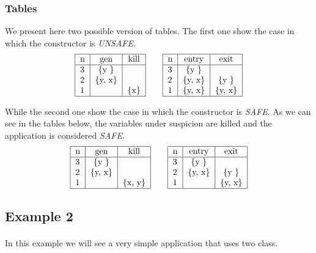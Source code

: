 \documentclass[letterpaper,twocolumn,10pt]{article}
\begin{document}
\subsubsection{Tables}
We present here two possible version of tables. The first one show the case in which the constructor is \emph{UNSAFE}.
\begin{align*}
\begin{tabular}{|l|*{2}{c|}}
  \hline
  n & gen & kill  \\
  \hline 
  3 & \{y \} & \\ 
  2 & \{y, x\} & \\
  1 &  & \{x\} \\
  \hline
\end{tabular}
\qquad
\begin{tabular}{|l|*{2}{c|}}
  \hline
  n & entry & exit \\
  \hline 
  3 & \{y \} & \\ 
  2 & \{y, x\} & \{y \}\\
  1 & \{y, x\} & \{y, x\} \\
  \hline
\end{tabular}
\end{align*}

While the second one show the case in which the constructor is \emph{SAFE}. As we can see in the tables below, the variables under suspicion are killed and the application is considered \emph{SAFE}.
\begin{align*}
\begin{tabular}{|l|*{2}{c|}}
  \hline
  n & gen & kill  \\
  \hline 
  3 & \{y \} & \\ 
  2 & \{y, x\} & \\
  1 &  & \{x, y\} \\
  \hline
\end{tabular}
\qquad
\begin{tabular}{|l|*{2}{c|}}
  \hline
  n & entry & exit \\
  \hline 
  3 & \{y \} & \\ 
  2 & \{y, x\} & \{y \}\\
  1 &  & \{y, x\} \\
  \hline
\end{tabular}
\end{align*}

\subsection{Example 2}
\paragraph{}
In this example we will see a very simple application that uses two class.
\end{document}

